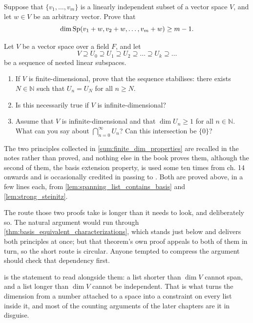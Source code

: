 \begin{exercise}
\label{exc:shifted_span_dimension}
Suppose that $\{v_1, \dots, v_m\}$ is a linearly independent subset of a vector space $V$, and let $w \in V$ be an arbitrary vector. Prove that
\[
\dim \operatorname{Sp}(v_1 + w, v_2 + w, \dots, v_m + w) \ge m - 1.
\]
\end{exercise}

\begin{exercise}
\label{exc:descending_chains_subspaces}
Let $V$ be a vector space over a field $F$, and let
\[
V \supseteq U_0 \supseteq U_1 \supseteq U_2 \supseteq \dots \supseteq U_k \supseteq \dots
\]
be a sequence of nested linear subspaces.
\begin{enumerate}
    \item If $V$ is finite-dimensional, prove that the sequence stabilises: there exists $N \in \mathbb{N}$ such that $U_n = U_N$ for all $n \ge N$.
    \item Is this necessarily true if $V$ is infinite-dimensional?
    \item Assume that $V$ is infinite-dimensional and that $\dim U_n \ge 1$ for all $n \in \mathbb{N}$. What can you say about $\bigcap_{n=0}^\infty U_n$? Can this intersection be $\{0\}$?
\end{enumerate}
\end{exercise}

\begin{ainote}
The two principles collected in \cref{sum:finite_dim_properties} are recalled in
the notes rather than proved, and nothing else in the book proves them, although
the second of them, the basis extension property, is used some ten times from
ch. 14 onwards and is occasionally credited in passing to . Both are proved above, in a few lines each, from
\cref{lem:spanning_list_contains_basis} and \cref{lem:strong_steinitz}.

The route those two proofs take is longer than it needs to look, and
deliberately so. The natural argument would run through
\cref{thm:basis_equivalent_characterizations}, which stands just below and
delivers both principles at once; but that theorem's own proof appeals to both
of them in turn, so the short route is circular. Anyone tempted to compress the
argument should check that dependency first.

 is the statement to read alongside them: a list
shorter than $\dim V$ cannot span, and a list longer than $\dim V$ cannot be
independent. That is what turns the dimension from a number attached to a space
into a constraint on every list inside it, and most of the counting arguments of
the later chapters are it in disguise.
\end{ainote}



